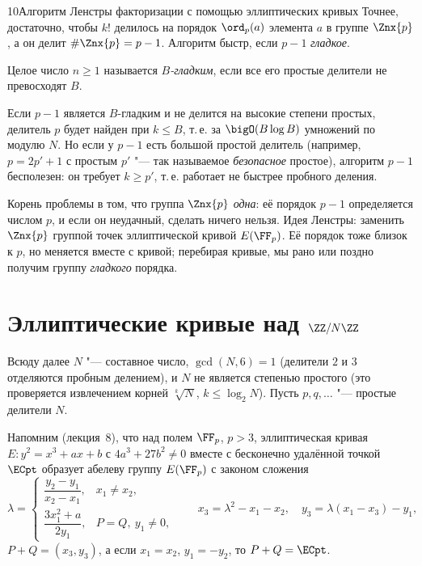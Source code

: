 \begin{lecture}{10}{Алгоритм Ленстры факторизации с помощью эллиптических кривых}
Точнее, достаточно, чтобы $k!$ делилось на порядок $\ord_p(a)$ элемента $a$ в группе $\Znx{p}$,
а он делит $\#\Znx{p} = p - 1$. Алгоритм быстр, если $p - 1$ \emph{гладкое}.

\begin{definition}
Целое число $n \ge 1$ называется \emph{$B$-гладким}, если все его простые делители не
превосходят $B$.
\end{definition}

Если $p - 1$ является $B$-гладким и не делится на высокие степени простых, делитель $p$ будет
найден при $k \le B$, т.\,е. за $\bigO(B \log B)$ умножений по модулю $N$. Но если у $p - 1$
есть большой простой делитель (например, $p = 2p' + 1$ с простым $p'$ "--- так называемое
\emph{безопасное} простое), алгоритм $p - 1$ бесполезен: он требует $k \ge p'$, т.\,е.
работает не быстрее пробного деления.

Корень проблемы в том, что группа $\Znx{p}$ \emph{одна}: её порядок $p - 1$ определяется
числом $p$, и если он неудачный, сделать ничего нельзя. Идея Ленстры: заменить $\Znx{p}$
группой точек эллиптической кривой $E(\FF_p)$. Её порядок тоже близок к $p$, но меняется вместе
с кривой; перебирая кривые, мы рано или поздно получим группу \emph{гладкого} порядка.


\section{Эллиптические кривые над \texorpdfstring{$\ZZ/N\ZZ$}{Z/NZ}}

Всюду далее $N$ "--- составное число, $\gcd(N, 6) = 1$ (делители $2$ и $3$ отделяются пробным
делением), и $N$ не является степенью простого (это проверяется извлечением корней
$\sqrt[k]{N}$, $k \le \log_2 N$). Пусть $p, q, \dots$ "--- простые делители $N$.

Напомним (лекция~8), что над полем $\FF_p$, $p > 3$, эллиптическая кривая
$E\colon y^2 = x^3 + ax + b$ с $4a^3 + 27b^2 \ne 0$ вместе с бесконечно удалённой точкой
$\ECpt$ образует абелеву группу $E(\FF_p)$ с законом сложения
\begin{equation}\label{l10:law}
  \lambda = \begin{cases}
    \dfrac{y_2 - y_1}{x_2 - x_1}, & x_1 \ne x_2,\\[2ex]
    \dfrac{3x_1^2 + a}{2y_1}, & P = Q,\ y_1 \ne 0,
  \end{cases}\qquad
  x_3 = \lambda^2 - x_1 - x_2, \quad y_3 = \lambda(x_1 - x_3) - y_1,
\end{equation}
$P + Q = (x_3, y_3)$, а если $x_1 = x_2$, $y_1 = -y_2$, то $P + Q = \ECpt$.


\end{lecture}
